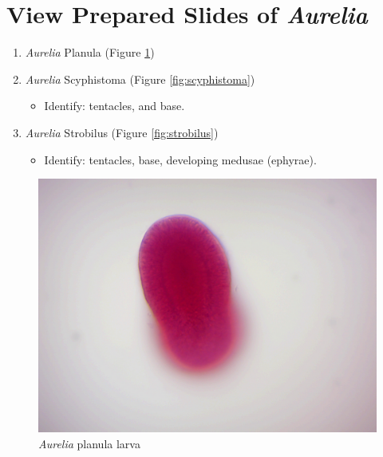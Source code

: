 \section{\texorpdfstring{View Prepared Slides of
\emph{Aurelia}}{View Prepared Slides of Aurelia}}\label{view-prepared-slides-of-Aurelia}
\begin{enumerate}
\def\labelenumi{\arabic{enumi}.}
\tightlist
\item
  \emph{Aurelia} Planula (Figure \ref{fig:planula})
\item
  \emph{Aurelia} Scyphistoma (Figure \ref{fig:scyphistoma})

  \begin{itemize}
  \tightlist
  \item
    Identify: tentacles, and base.
  \end{itemize}
\item
  \emph{Aurelia} Strobilus (Figure \ref{fig:strobilus})

  \begin{itemize}
  \tightlist
  \item
    Identify: tentacles, base, developing medusae (ephyrae).
  \end{itemize}
\end{enumerate}

\begin{figure}

{\centering \includegraphics[width=0.7\linewidth]{./figures/porifera/aurelia_planula}

}

\caption{\emph{Aurelia} planula larva}\label{fig:planula}
\end{figure}

